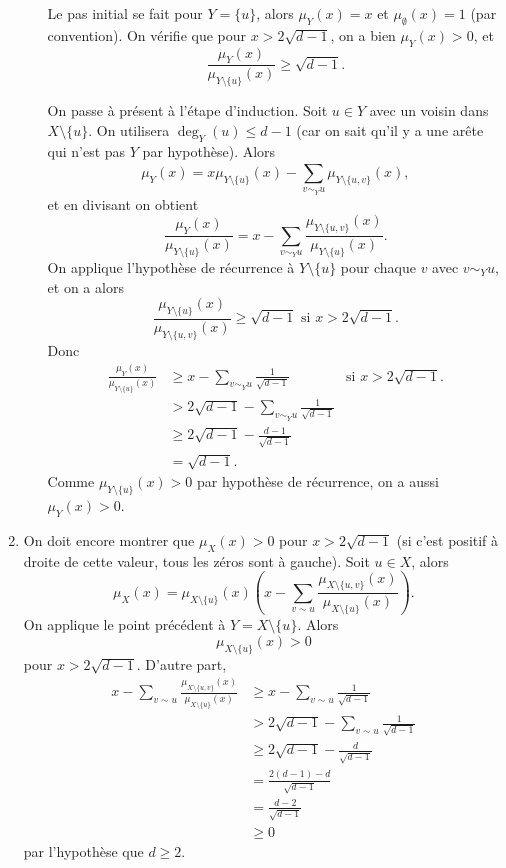 \begin{preuve}[de la Proposition]
\begin{enumerate}
\begin{enumerate}
      Le pas initial se fait pour $Y = \{u\}$, alors $\mu_Y(x) = x$ et $\mu_\emptyset(x) = 1$ (par
      convention). On vérifie que pour $x > 2\sqrt{d-1}$, on a bien $\mu_Y(x) > 0$, et 
      \[ \frac{\mu_Y(x)}{\mu_{Y \setminus \{u\}}(x)}\geq \sqrt{d-1}. \]

      On passe à présent à l'étape d'induction. Soit $u \in Y$ avec un voisin dans $X \setminus \{u\}$. On
      utilisera $\deg_Y(u) \leq d-1$ (car on sait qu'il y a une arête qui n'est pas $Y$ par hypothèse). Alors 
      \[ \mu_Y(x) = x\mu_{Y \setminus \{u\}}(x) - \sum_{v \sim_Y u}^{} \mu_{Y \setminus \{u,v\}}(x), \]
      et en divisant on obtient 
      \[ \frac{\mu_Y(x)}{\mu_{Y \setminus \{u\}}(x)} = x - \sum_{v \sim_Y u}^{} \frac{\mu_{Y \setminus \{u,
            v\}}(x)}{\mu_{Y \setminus \{u\}}(x)}.  \]
      On applique l'hypothèse de récurrence à $Y \setminus \{u\}$ pour chaque $v$ avec $v \sim_Y u$, et on a
      alors 
      \[ \frac{\mu_{Y \setminus \{u\}}(x)}{\mu_{Y \setminus \{u,v\}}(x)} \geq \sqrt{d-1} \text{ si } x > 2
        \sqrt{d -1}. \]
      Donc 
      \begin{align*}
        \frac{\mu_Y(x)}{\mu_{Y \setminus \{u\}}(x)}
        &\geq x - \sum_{v \sim_Y u}^{} \frac{1}{\sqrt{d-1}} &\text{
                                                              si } x > 2 \sqrt{d-1}.\\
        &> 2\sqrt{d-1} - \sum_{v \sim_Y u}^{} \frac{1}{\sqrt{d-1}}\\
        &\geq 2 \sqrt{d-1} - \frac{d-1}{\sqrt{d-1}}\\
        &= \sqrt{d-1}.
      \end{align*}
      Comme $\mu_{Y \setminus \{u\}}(x) > 0$ par hypothèse de récurrence, on a aussi $\mu_Y(x) > 0$.
    \end{enumerate}

  \item On doit encore montrer que $\mu_X(x) > 0$ pour $x > 2 \sqrt{d-1}$ (si c'est positif à droite de cette
    valeur, tous les zéros sont à gauche). Soit $u \in X$, alors 
    \[ \mu_X(x) = \mu_{X \setminus \{u\}}(x)\left( x - \sum_{v \sim u}^{} \frac{\mu_{X \setminus
            \{u,v\}}(x)}{\mu_{X \setminus \{u\}}(x)} \right). \]
    On applique le point précédent à $Y = X \setminus \{u\}$. Alors 
    \[ \mu_{X \setminus \{u\}}(x) > 0 \]
    pour $x > 2 \sqrt{d-1}$. D'autre part, 
    \begin{align*}
      x - \sum_{v \sim u}^{} \frac{\mu_{X \setminus \{u,v\}}(x)}{\mu_{X \setminus \{u\}}(x)}
      &\geq x - \sum_{v\sim u}^{} \frac{1}{\sqrt{d-1}} \\
      &> 2 \sqrt{d-1} - \sum_{v \sim
        u}^{}\frac{1}{\sqrt{d-1}}\\
      &\geq 2 \sqrt{d-1} - \frac{d}{\sqrt{d-1}} \\
      &= \frac{2(d-1) - d}{\sqrt{d-1}} \\
      &= \frac{d - 2}{\sqrt{d - 1}}\\
        &\geq 0
    \end{align*}
    par l'hypothèse que $d \geq 2$.
  \end{enumerate}
\end{preuve}



